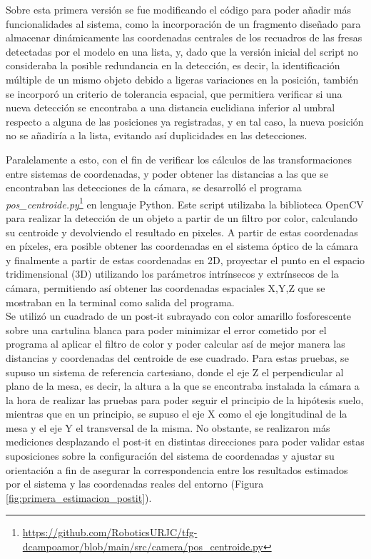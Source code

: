 Sobre esta primera versión se fue modificando el código para poder añadir más funcionalidades al sistema, como la incorporación de un fragmento diseñado para almacenar dinámicamente las coordenadas centrales de los recuadros de las fresas detectadas por el modelo en una lista, y, dado que la versión inicial del script no consideraba la posible redundancia en la detección, es decir, la identificación múltiple de un mismo objeto debido a ligeras variaciones en la posición, también se incorporó un criterio de tolerancia espacial, que permitiera verificar si una nueva detección se encontraba a una distancia euclidiana inferior al umbral respecto a alguna de las posiciones ya registradas, y en tal caso, la nueva posición no se añadiría a la lista, evitando así duplicidades en las detecciones.

Paralelamente a esto, con el fin de verificar los cálculos de las transformaciones entre sistemas de coordenadas, y poder obtener las distancias a las que se encontraban las detecciones de la cámara, se desarrolló el programa \textit{pos\_centroide.py}\footnote{\url{https://github.com/RoboticsURJC/tfg-dcampoamor/blob/main/src/camera/pos_centroide.py}} en lenguaje Python. Este script utilizaba la biblioteca OpenCV para realizar la detección de un objeto a partir de un filtro por color, calculando su centroide y devolviendo el resultado en pixeles. A partir de estas coordenadas en píxeles, era posible obtener las coordenadas en el sistema óptico de la cámara y finalmente a partir de estas coordenadas en 2D, proyectar el punto en el espacio tridimensional (3D) utilizando los parámetros intrínsecos y extrínsecos de la cámara, permitiendo así obtener las coordenadas espaciales X,Y,Z que se mostraban en la terminal como salida del programa. \\

Se utilizó un cuadrado de un post-it subrayado con color amarillo fosforescente sobre una cartulina blanca para poder minimizar el error cometido por el programa al aplicar el filtro de color y poder calcular así de mejor manera las distancias y coordenadas del centroide de ese cuadrado. Para estas pruebas, se supuso un sistema de referencia cartesiano, donde el eje Z el perpendicular al plano de la mesa, es decir, la altura a la que se encontraba instalada la cámara a la hora de realizar las pruebas para poder seguir el principio de la hipótesis suelo, mientras que en un principio, se supuso el eje X como el eje longitudinal de la mesa y el eje Y el transversal de la misma. No obstante, se realizaron más mediciones desplazando el post-it en distintas direcciones para poder validar estas suposiciones sobre la configuración del sistema de coordenadas y ajustar su orientación a fin de asegurar la correspondencia entre los resultados estimados por el sistema y las coordenadas reales del entorno (Figura \ref{fig:primera_estimacion_postit}).

